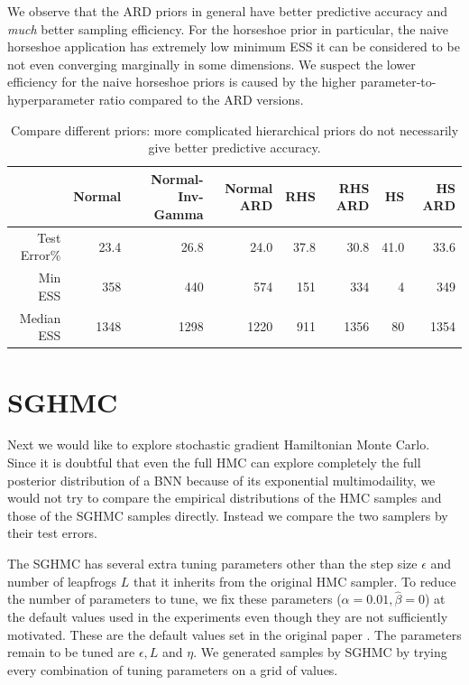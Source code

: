 \documentclass[12pt]{report}
\begin{document}
We observe that the ARD priors in general have better predictive accuracy and \textit{much} better sampling efficiency. For the horseshoe prior in particular, the naive horseshoe application has extremely low minimum ESS it can be considered to be not even converging marginally in some dimensions. We suspect the lower efficiency for the naive horseshoe priors is caused by the higher parameter-to-hyperparameter ratio compared to the ARD versions.
\begin{table}[]
\centering
\begin{tabular}{@{}rrrrrrrr@{}}
\toprule
              & Normal & Normal-Inv-Gamma & Normal ARD     & RHS     & RHS ARD & HS  & HS ARD \\ \midrule
Test Error$\%$    & 23.4    & 26.8    & 24.0& 37.8    & 30.8      & 41.0       & 33.6               \\ \midrule
Min ESS       & 358      & 440   & 574  & 151  & 334     & 4       & 349              \\ \midrule
Median ESS    & 1348      & 1298  & 1220  & 911 & 1356     & 80      & 1354             \\ \midrule
\end{tabular}
\caption{Compare different priors: more complicated hierarchical priors do not necessarily give better predictive accuracy.}
\label{my-label}
\end{table}

\section{SGHMC}
Next we would like to explore stochastic gradient Hamiltonian Monte Carlo. Since it is doubtful that even the full HMC can explore completely the full posterior distribution of a BNN because of its exponential multimodaility, we would not try to compare the empirical distributions of the HMC samples and those of the SGHMC samples directly. Instead we compare the two samplers by their test errors.

The SGHMC has several extra tuning parameters other than the step size $\epsilon$ and number of leapfrogs $L$ that it inherits from the original HMC sampler. To reduce the number of parameters to tune, we fix these parameters ($\alpha=0.01, \hat{\beta}=0$) at the default values used in the experiments even though they are not sufficiently motivated. These are the default values set in the original paper \cite{chen2014stochastic}. The parameters remain to be tuned are $\epsilon,L $ and $\eta$. We generated samples by SGHMC by trying every combination of tuning parameters on a grid of values.
\end{document}
